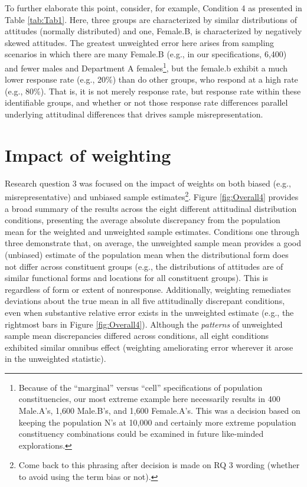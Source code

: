 \documentclass[
  man,mask]{apa7}
\begin{document}
To further elaborate this point, consider, for example, Condition 4 as presented in Table \ref{tab:Tab1}. Here, three groups are characterized by similar distributions of attitudes (normally distributed) and one, Female.B, is characterized by negatively skewed attitudes. The greatest unweighted error here arises from sampling scenarios in which there are many Female.B (e.g., in our specifications, 6,400) and fewer males and Department A females\footnote{Because of the ``marginal'' versus ``cell'' specifications of population constituencies, our most extreme example here necessarily results in 400 Male.A's, 1,600 Male.B's, and 1,600 Female.A's. This was a decision based on keeping the population N's at 10,000 and certainly more extreme population constituency combinations could be examined in future like-minded explorations.}, but the female.b exhibit a much lower response rate (e.g., 20\%) than do other groups, who respond at a high rate (e.g., 80\%). That is, it is not merely response rate, but response rate within these identifiable groups, and whether or not those response rate differences parallel underlying attitudinal differences that drives sample misrepresentation.

\section{Impact of weighting}\label{impact-of-weighting}

Research question 3 was focused on the impact of weights on both biased (e.g., misrepresentative) and unbiased sample estimates\footnote{Come back to this phrasing after decision is made on RQ 3 wording (whether to avoid using the term bias or not).}. Figure \ref{fig:Overall4} provides a broad summary of the results across the eight different attitudinal distribution conditions, presenting the average absolute discrepancy from the population mean for the weighted and unweighted sample estimates. Conditions one through three demonstrate that, on average, the unweighted sample mean provides a good (unbiased) estimate of the population mean when the distributional form does not differ across constituent groups (e.g., the distributions of attitudes are of similar functional forms and locations for all constituent groups). This is regardless of form or extent of nonresponse. Additionally, weighting remediates deviations about the true mean in all five attitudinally discrepant conditions, even when substantive relative error exists in the unweighted estimate (e.g., the rightmost bars in Figure \ref{fig:Overall4}). Although the \emph{patterns} of unweighted sample mean discrepancies differed across conditions, all eight conditions exhibited similar omnibus effect (weighting ameliorating error wherever it arose in the unweighted statistic).
\end{document}
